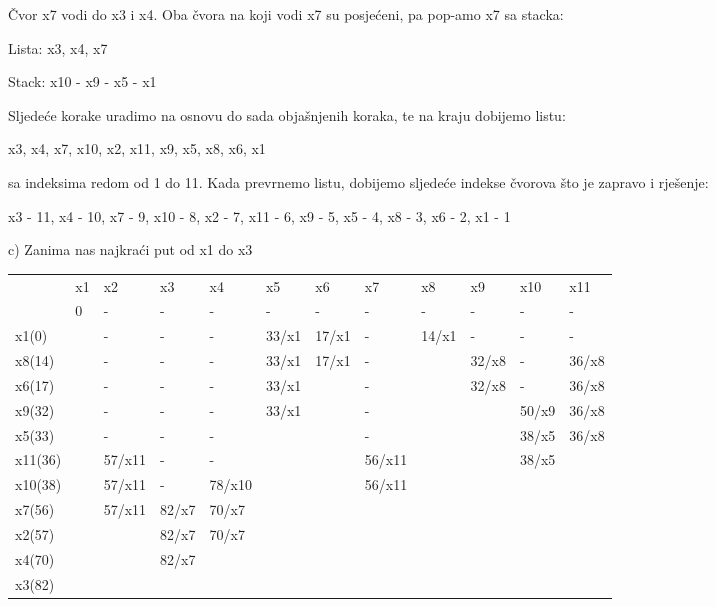 \documentclass[12pt]{article}
\begin{document}
Čvor x7 vodi do x3 i x4. Oba čvora na koji vodi x7 su posjećeni, pa pop-amo x7 sa stacka:

Lista: x3, x4, x7

Stack: x10 - x9 - x5 - x1

Sljedeće korake uradimo na osnovu do sada objašnjenih koraka, te na kraju dobijemo listu:

x3, x4, x7, x10, x2, x11, x9, x5, x8, x6, x1

sa indeksima redom od 1 do 11. Kada prevrnemo listu, dobijemo sljedeće indekse čvorova što je zapravo i rješenje:

x3 - 11, x4 - 10, x7 - 9, x10 - 8, x2 - 7, x11 - 6, x9 - 5, x5 - 4, x8 - 3, x6 - 2, x1 - 1

\newpage

c) Zanima nas najkraći put od x1 do x3

\begin{table}[hp]
\centering
\hspace*{-0.8in}
\begin{tabular}{|l|l|l|l|l|l|l|l|l|l|l|l|}
\hline
\multirow{2}{*}{} & x1 & x2 & x3 & x4 & x5 & x6 & x7 & x8 & x9 & x10 & x11 \\ \cline{2-12} 
 & 0 & - & - & - & - & - & - & - & - & - & - \\ \hline
x1(0) &  & - & - & - & 33/x1 & 17/x1 & - & 14/x1 & - & - & - \\ \hline
x8(14) &  & - & - & - & 33/x1 & 17/x1 & - &  & 32/x8 & - & 36/x8 \\ \hline
x6(17) &  & - & - & - & 33/x1 &  & - &  & 32/x8 & - & 36/x8 \\ \hline
x9(32) &  & - & - & - & 33/x1 &  & - &  &  & 50/x9 & 36/x8 \\ \hline
x5(33) &  & - & - & - &  &  & - &  &  & 38/x5 & 36/x8 \\ \hline
x11(36) &  & 57/x11 & - & - &  &  & 56/x11 &  &  & 38/x5 &  \\ \hline
x10(38) &  & 57/x11 & - & 78/x10 &  &  & 56/x11 &  &  &  &  \\ \hline
x7(56) &  & 57/x11 & 82/x7 & 70/x7 &  &  &  &  &  &  &  \\ \hline
x2(57) &  &  & 82/x7 & 70/x7 &  &  &  &  &  &  &  \\ \hline
x4(70) &  &  & 82/x7 &  &  &  &  &  &  &  &  \\ \hline
x3(82) &  &  &  &  &  &  &  &  &  &  &  \\ \hline
\end{tabular}
\end{table}
\end{document}
